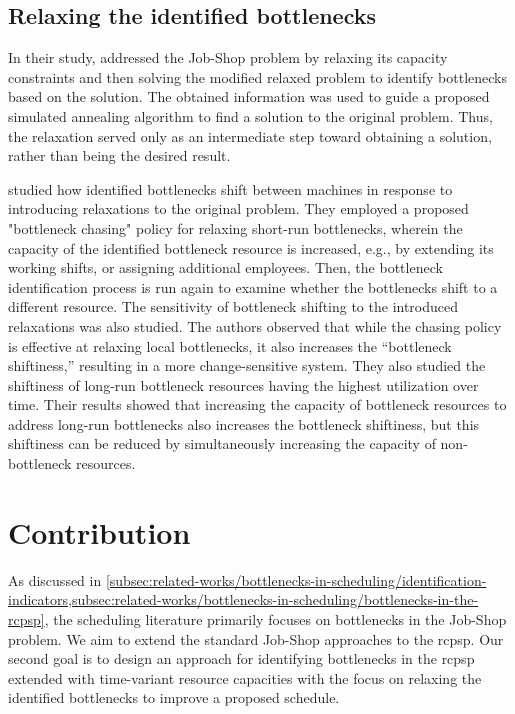 \subsection{Relaxing the identified bottlenecks} \label{subsec:related-works/bottlenecks-in-scheduling/relaxing-bottlenecks}

In their study, \citet{Zhang2012} addressed the Job-Shop problem by relaxing its capacity constraints
and then solving the modified relaxed problem to identify bottlenecks based on the solution.
The obtained information was used to guide a proposed simulated annealing
algorithm to find a solution to the original problem.
Thus, the relaxation served only as an intermediate step toward obtaining a solution,
rather than being the desired result.

\citet{Lawrence1994} studied how identified bottlenecks shift between machines
in response to introducing relaxations to the original problem.
They employed a proposed "bottleneck chasing" policy for relaxing short-run bottlenecks,
wherein the capacity of the identified bottleneck resource is increased,
e.g., by extending its working shifts, or assigning additional employees.
Then, the bottleneck identification process is run again to examine
whether the bottlenecks shift to a different resource.
The sensitivity of bottleneck shifting to the introduced relaxations was also studied.
The authors observed that while the chasing policy is effective at relaxing local bottlenecks,
it also increases the \enquote{bottleneck shiftiness,}
resulting in a more change-sensitive system.
They also studied the shiftiness of long-run bottleneck resources having the highest utilization over time.
Their results showed that increasing the capacity of bottleneck resources
to address long-run bottlenecks also increases the bottleneck shiftiness,
but this shiftiness can be reduced by simultaneously increasing the capacity of non-bottleneck
resources.

\section{Contribution} \label{sec:related-works/contribution}

As discussed in \cref{subsec:related-works/bottlenecks-in-scheduling/identification-indicators,subsec:related-works/bottlenecks-in-scheduling/bottlenecks-in-the-rcpsp},
the scheduling literature primarily focuses on bottlenecks in the Job-Shop problem.
We aim to extend the standard Job-Shop approaches to the \ac{rcpsp}.
Our second goal is to design an approach for identifying bottlenecks in the \ac{rcpsp}
extended with time-variant resource capacities
with the focus on relaxing the identified bottlenecks to improve a proposed schedule.
